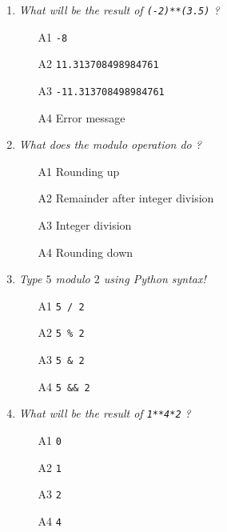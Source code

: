 \begin{enumerate}
\vspace{6mm}

\item {\em What will be the result of {\tt (-2)**(3.5)} ?}\\

\begin{enumerate}
\item[A1] {\tt -8}
\item[A2] {\tt 11.313708498984761}
\item[A3] {\tt -11.313708498984761}
\item[A4] Error message
\end{enumerate}

\vspace{6mm}

\item {\em What does the {\em modulo} operation do ?}\\

\begin{enumerate}
\item[A1] Rounding up
\item[A2] Remainder after integer division
\item[A3] Integer division
\item[A4] Rounding down
\end{enumerate}

\vspace{6mm}

\item {\em Type $5$ modulo $2$ using Python syntax!}\\

\begin{enumerate}
\item[A1] {\tt 5 / 2}
\item[A2] {\tt 5 \% 2}
\item[A3] {\tt 5 \& 2}
\item[A4] {\tt 5 \&\& 2}
\end{enumerate}

\vspace{6mm}

\item {\em What will be the result of {\tt 1**4*2} ?}\\

\begin{enumerate}
\item[A1] {\tt 0}
\item[A2] {\tt 1}
\item[A3] {\tt 2}
\item[A4] {\tt 4}
\end{enumerate}


\end{enumerate}
